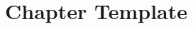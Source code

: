 \documentclass[../main.tex]{subfiles}
\begin{document}
\chapter{Chapter Template}\label{ch:}
\end{document}
